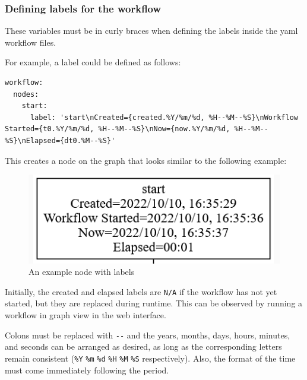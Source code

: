 \subsubsection{Defining labels for the
workflow}\label{defining-labels-for-the-workflow}

These variables must be in curly braces when defining the labels inside
the yaml workflow files.

For example, a label could be defined as follows:

\begin{verbatim}
workflow:
  nodes:
    start:
      label: 'start\nCreated={created.%Y/%m/%d, %H--%M--%S}\nWorkflow Started={t0.%Y/%m/%d, %H--%M--%S}\nNow={now.%Y/%m/%d, %H--%M--%S}\nElapsed={dt0.%M--%S}'
\end{verbatim}

This creates a node on the graph that looks similar to the following
example:

\begin{figure}
\centering
\includegraphics{images/labelmaker-example.png}
\caption{An example node with labels}
\end{figure}

Initially, the created and elapsed labels are \texttt{N/A} if the
workflow has not yet started, but they are replaced during runtime. This
can be observed by running a workflow in graph view in the web
interface.

Colons must be replaced with \texttt{-\/-} and the years, months, days,
hours, minutes, and seconds can be arranged as desired, as long as the
corresponding letters remain consistent (\texttt{\%Y} \texttt{\%m}
\texttt{\%d} \texttt{\%H} \texttt{\%M} \texttt{\%S} respectively). Also,
the format of the time must come immediately following the period.

